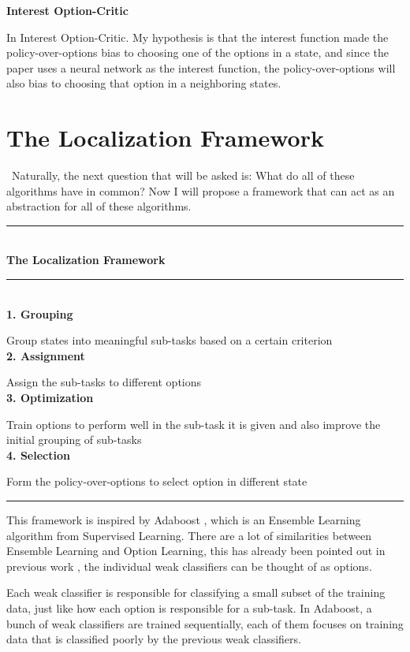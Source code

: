 \documentclass{article}
\begin{document}
	\large{\bfseries{Interest Option-Critic}}\vspace{0.05in}

	\normalsize{\quad In Interest Option-Critic. My hypothesis is that the interest function made the policy-over-options bias to choosing one of the options in a state, and since the paper uses a neural network as the interest function, the policy-over-options will also bias to choosing that option in a neighboring states.}
	\section{The Localization Framework}
	\qquad \ Naturally, the next question that will be asked is: What do all of these algorithms have in common? Now I will propose a framework that can act as an abstraction for all of these algorithms.\vspace{0.1in}\\
	\rule{420pt}{2pt}\vspace{0.1in}\\
	\large{\bfseries{The Localization Framework}}\\
	\rule{420pt}{0.4pt}\\
	\normalsize{\bfseries{1. Grouping}}
	
	\normalsize{Group states into meaningful sub-tasks based on a certain criterion}\\
	{\bfseries{2. Assignment}}
	
	\normalsize{Assign the sub-tasks to different options}\\
	{\bfseries{3. Optimization}}
	
	\normalsize{Train options to perform well in the sub-task it is given and also improve the initial grouping of sub-tasks}\\
	{\bfseries{4. Selection}}
	
	\normalsize{Form the policy-over-options to select option in different state}\\
	\rule{420pt}{1pt}\vspace{0.1in}
	
	\quad This framework is inspired by Adaboost \cite{adaboost}, which is an Ensemble Learning algorithm from Supervised Learning. There are a lot of similarities between Ensemble Learning and Option Learning, this has already been pointed out in previous work \cite{zhang2018ace}, the individual weak classifiers can be thought of as options.
	
	\quad Each weak classifier is responsible for classifying a small subset of the training data, just like how each option is responsible for a sub-task. In Adaboost, a bunch of weak classifiers are trained sequentially, each of them focuses on training data that is classified poorly by the previous weak classifiers.
	
\end{document}
